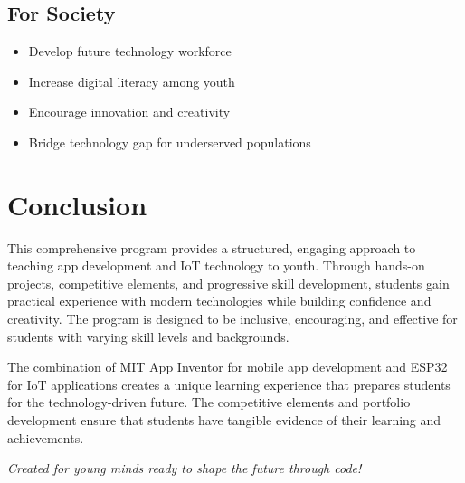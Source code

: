 \documentclass[12pt,a4paper]{article}
\begin{document}
\subsection{For Society}
\begin{itemize}
    \item Develop future technology workforce
    \item Increase digital literacy among youth
    \item Encourage innovation and creativity
    \item Bridge technology gap for underserved populations
\end{itemize}

\section{Conclusion}

This comprehensive program provides a structured, engaging approach to teaching app development and IoT technology to youth. Through hands-on projects, competitive elements, and progressive skill development, students gain practical experience with modern technologies while building confidence and creativity. The program is designed to be inclusive, encouraging, and effective for students with varying skill levels and backgrounds.

The combination of MIT App Inventor for mobile app development and ESP32 for IoT applications creates a unique learning experience that prepares students for the technology-driven future. The competitive elements and portfolio development ensure that students have tangible evidence of their learning and achievements.

\vspace{1cm}
\textit{Created for young minds ready to shape the future through code!}
\end{document}
